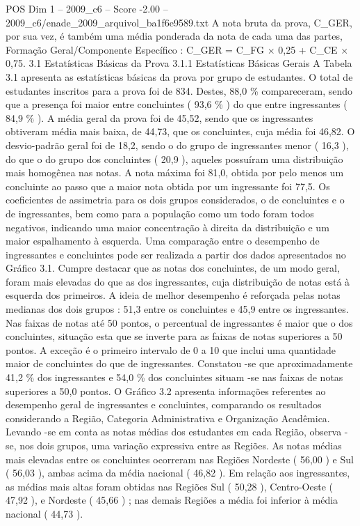 \begin{textsample}{POS Dim 1 – 2009\_c6 – Score -2.00 – 2009\_c6/enade\_2009\_arquivol\_ba1f6e9589.txt}
A nota bruta da prova, C\_GER, por sua vez, é também uma média ponderada da nota de cada uma das partes, Formação Geral/Componente Específico : C\_GER = C\_FG × 0,25 + C\_CE × 0,75. 3.1 Estatísticas Básicas da Prova 3.1.1 Estatísticas Básicas Gerais A Tabela 3.1 apresenta as estatísticas básicas da prova por grupo de estudantes.
O total de estudantes inscritos para a prova foi de 834.
Destes, 88,0 \% compareceram, sendo que a presença foi maior entre concluintes ( 93,6 \% ) do que entre ingressantes ( 84,9 \% ).
A média geral da prova foi de 45,52, sendo que os ingressantes obtiveram média mais baixa, de 44,73, que os concluintes, cuja média foi 46,82.
O desvio-padrão geral foi de 18,2, sendo o do grupo de ingressantes menor ( 16,3 ), do que o do grupo dos concluintes ( 20,9 ), aqueles possuíram uma distribuição mais homogênea nas notas.
A nota máxima foi 81,0, obtida por pelo menos um concluinte ao passo que a maior nota obtida por um ingressante foi 77,5.
Os coeficientes de assimetria para os dois grupos considerados, o de concluintes e o de ingressantes, bem como para a população como um todo foram todos negativos, indicando uma maior concentração à direita da distribuição e um maior espalhamento à esquerda.
Uma comparação entre o desempenho de ingressantes e concluintes pode ser realizada a partir dos dados apresentados no Gráfico 3.1.
Cumpre destacar que as notas dos concluintes, de um modo geral, foram mais elevadas do que as dos ingressantes, cuja distribuição de notas está à esquerda dos primeiros.
A ideia de melhor desempenho é reforçada pelas notas medianas dos dois grupos : 51,3 entre os concluintes e 45,9 entre os ingressantes.
Nas faixas de notas até 50 pontos, o percentual de ingressantes é maior que o dos concluintes, situação esta que se inverte para as faixas de notas superiores a 50 pontos.
A exceção é o primeiro intervalo de 0 a 10 que inclui uma quantidade maior de concluintes do que de ingressantes.
Constatou -se que aproximadamente 41,2 \% dos ingressantes e 54,0 \% dos concluintes situam -se nas faixas de notas superiores a 50,0 pontos.
O Gráfico 3.2 apresenta informações referentes ao desempenho geral de ingressantes e concluintes, comparando os resultados considerando a Região, Categoria Administrativa e Organização Acadêmica.
Levando -se em conta as notas médias dos estudantes em cada Região, observa -se, nos dois grupos, uma variação expressiva entre as Regiões.
As notas médias mais elevadas entre os concluintes ocorreram nas Regiões Nordeste ( 56,00 ) e Sul ( 56,03 ), ambas acima da média nacional ( 46,82 ).
Em relação aos ingressantes, as médias mais altas foram obtidas nas Regiões Sul ( 50,28 ), Centro-Oeste ( 47,92 ), e Nordeste ( 45,66 ) ; nas demais Regiões a média foi inferior à média nacional ( 44,73 ).

\end{textsample}
